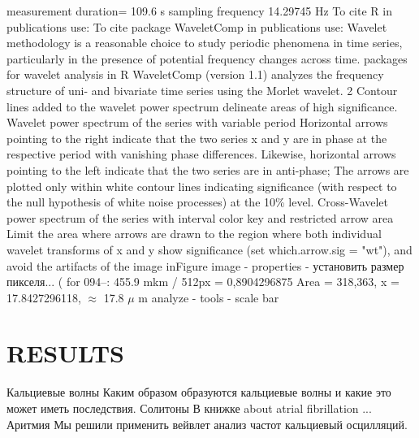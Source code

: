 \documentclass[a4paper,12pt]{article}
\begin{document}
measurement duration= 109.6 s
sampling frequency 14.29745 Hz
To cite R in publications use:  \cite{team2014r}
To cite package WaveletComp in publications use: \cite{roesch2014waveletcomp}
Wavelet methodology is a reasonable choice to study periodic phenomena in time series, particularly in
the presence of potential frequency changes across time.
packages for wavelet analysis in R
WaveletComp (version 1.1) analyzes the frequency structure of uni- and bivariate time series using the Morlet wavelet. 2
Contour lines added to the wavelet power spectrum delineate areas of high significance.
Wavelet power spectrum of the series with variable period
Horizontal arrows pointing to the right indicate that the two series x and y are in phase at the respective period with vanishing phase differences.
Likewise, horizontal arrows pointing to the left indicate that the two series are in anti-phase;
The arrows are plotted only within white contour lines indicating significance (with respect to the null hypothesis of white noise processes) at the 10\% level.
Cross-Wavelet power spectrum of the series with interval color key and restricted arrow area
Limit the area where arrows are drawn to the region where both individual wavelet transforms of x and y show significance (set which.arrow.sig = "wt"), and avoid the artifacts of the image inFigure
image - properties - установить размер пикселя...
( for 094--: 455.9 mkm / 512px = 0,8904296875
Area = 318,363, x = 17.8427296118, $\approx$ 17.8 $\mu$ m
analyze - tools - scale bar

\section{RESULTS}
Кальциевые волны
Каким образом образуются кальциевые волны и какие это может иметь последствия.
Солитоны
В книжке \cite{kockskamper2002subcellular} about atrial fibrillation ...
Аритмия
Мы решили применить вейвлет анализ частот кальциевый осцилляций.
\end{document}

